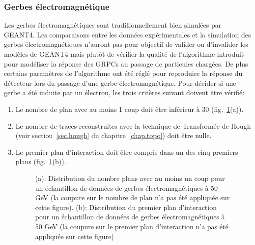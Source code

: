 \subsubsection{Gerbes électromagnétique}
 Les gerbes électromagnétiques sont traditionnellement bien simulées par GEANT4. Les comparaisons entre les données expérimentales et la simulation des gerbes électromagnétiques n'auront pas pour objectif de valider ou d'invalider les modèles de GEANT4 mais plutôt de vérifier la qualité de l'algorithme introduit pour modéliser la réponse des GRPCs au passage de particules chargées. De plus certains paramètres de l’algorithme ont été réglé pour reproduire la réponse du détecteur lors du passage d'une gerbe électromagnétique.
Pour décider si une gerbe a été induite par un électron, les trois critères suivant doivent être vérifié:
\begin{enumerate}[~~1-]
\item Le nombre de plan avec au moins 1 coup doit être inférieur à 30 (fig.~\ref{fig.e-_begin_layer}(a)).
\item Le nombre de traces reconstruites avec la technique de Transformée de Hough (voir section~\ref{sec.hough} du chapitre~\ref{chap.topo}) 
doit être nulle. %
\item Le premier plan d’interaction doit être compris dans un des cinq premiers plans (fig.~\ref{fig.e-_begin_layer}(b)).
  \begin{figure}[!ht]
    \caption{(a): Distribution du nombre plans avec au moins un coup pour un échantillon de données de gerbes électromagnétiques à 50 GeV (la coupure sur le nombre de plan n'a pas été appliquée sur cette figure). (b): Distribution du premier plan d’interaction pour un échantillon de données de gerbes électromagnétiques à 50 GeV (la coupure sur le premier plan d'interaction n'a pas été appliquée sur cette figure)\label{fig.e-_begin_layer}}
  \end{figure}
\end{enumerate}

